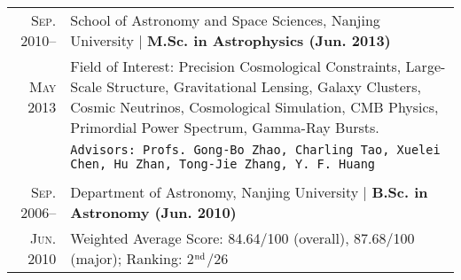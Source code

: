\documentclass[10pt]{article}
\begin{document}
\begin{tabular}{r|p{17.5cm}}
\textsc{Sep. 2010}--     &   School of Astronomy and Space Sciences, Nanjing University  |  \textbf{M.Sc. in Astrophysics (Jun. 2013)}   \\
\textsc{May 2013}
& Field of Interest: Precision Cosmological Constraints, Large-Scale Structure, Gravitational Lensing, Galaxy Clusters, Cosmic Neutrinos, Cosmological  Simulation, CMB Physics, Primordial Power Spectrum, Gamma-Ray Bursts. \\
&   \texttt{Advisors: Profs. Gong-Bo Zhao, Charling Tao, Xuelei Chen, Hu Zhan, Tong-Jie Zhang, Y. F. Huang}   \\
\multicolumn{2}{c}{} \\

\textsc{Sep. 2006}--     &   Department of Astronomy, Nanjing University  |  \textbf{B.Sc. in Astronomy (Jun. 2010)}    \\
\textsc{Jun. 2010}       &   Weighted Average Score: 84.64/100 (overall), 87.68/100 (major); Ranking: 2$^{\rm nd}$/26  \\
\end{tabular}


\end{document}
